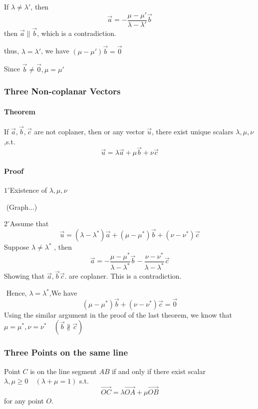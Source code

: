 \documentclass[UTF8]{ctexart}
\begin{document}
If $\lambda \neq \lambda '$, then 
$$
\vec a  = - \frac {\mu - \mu '}{\lambda - \lambda  ' }\vec b
$$
then $\vec a \parallel \vec b$, which is a contradiction.

thus, $\lambda = \lambda '$, we have $(\mu - \mu ')\vec b = \vec 0$

Since $\vec b \neq \vec 0 , \mu = \mu '$


\subsubsection{Three Non-coplanar Vectors}




\paragraph{Theorem} If $\vec a, \vec b , \vec c$ are not coplaner, then or any vector $\vec u$, there exist unique scalars $\lambda,\mu,\nu$,s.t.
$$
\vec u =\lambda \vec a+ \mu \vec b + \nu \vec c
$$
\paragraph{Proof} 
$1^{\circ}$Existence of $\lambda,\mu ,\nu $

​			(Graph...)

​			$2^{\circ}$Assume that 
$$
\vec u = (\lambda  - \lambda^*)\vec a + (\mu - \mu^*)\vec b + (\nu - \nu^*)\vec c
$$
​				Suppose $\lambda \neq \lambda^*$ , then 
$$
\vec a  = - \frac{\mu - \mu^*}{\lambda- \lambda^*}\vec b - \frac {\nu - \nu^*}{\lambda - \lambda^*}\vec c
$$
​				Showing that $\vec a,\vec b \vec c $. are coplaner. This is a contradiction. 

​				Hence, $\lambda = \lambda ^*$,We have 
$$
(\mu - \mu ^*)\vec b + (\nu - \nu ^*)\vec c = \vec 0 
$$
​				Using the similar argument in the proof of the last theorem, we know that  $\mu = \mu ^*,\nu = \nu ^*\quad (\vec b \not \parallel \vec c)$



\subsubsection{Three Points on the same line}

Point $C$ is on the line segment  $AB$ if and only if there exist scalar $\lambda ,\mu \geq 0 \quad (\lambda + \mu = 1)$ s.t. 
$$
\overrightarrow{OC} = \lambda \overrightarrow{OA} + \mu \overrightarrow{OB}
$$
for any point $O$.
\end{document}

